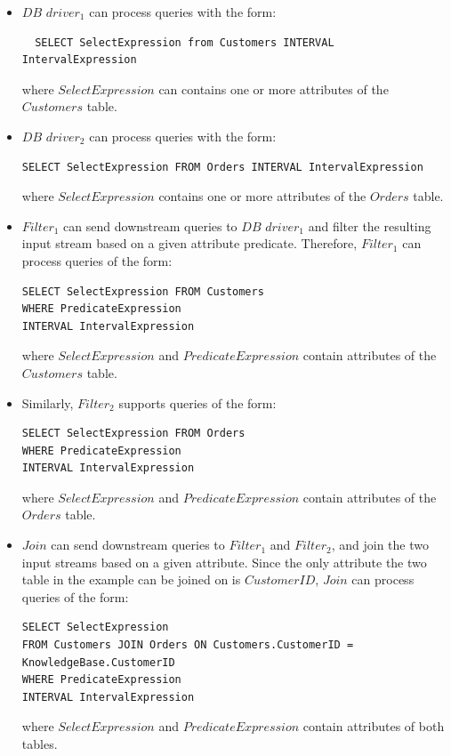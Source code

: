 \begin{itemize}
  \item $DB$ $driver_1$ can process queries with the form:
  \begin{lstlisting}
  SELECT SelectExpression from Customers INTERVAL IntervalExpression
  \end{lstlisting}
  where $SelectExpression$ can contains one or more attributes of the $Customers$ table.

\item $DB$ $driver_2$ can process queries with the form:
\begin{lstlisting}
SELECT SelectExpression FROM Orders INTERVAL IntervalExpression
\end{lstlisting}
where $SelectExpression$ contains one or more attributes of the $Orders$ table.

\item $Filter_1$ can send downstream queries to $DB$ $driver_1$ and filter the resulting input stream based on a given
attribute predicate.
Therefore, $Filter_1$ can process queries of the form:
\begin{lstlisting}
SELECT SelectExpression FROM Customers
WHERE PredicateExpression
INTERVAL IntervalExpression
\end{lstlisting}
where $SelectExpression$ and $PredicateExpression$ contain attributes of the $Customers$ table.

\item Similarly, $Filter_2$ supports queries of the form:
\begin{lstlisting}
SELECT SelectExpression FROM Orders
WHERE PredicateExpression
INTERVAL IntervalExpression
\end{lstlisting}
where $SelectExpression$ and $PredicateExpression$ contain attributes of the $Orders$ table.

\item $Join$ can send downstream queries to $Filter_1$ and $Filter_2$,
and join the two input streams based on a given attribute.
Since the only attribute the two table in the example can be joined on is $CustomerID$,
$Join$ can process queries of the form:
\begin{lstlisting}
SELECT SelectExpression
FROM Customers JOIN Orders ON Customers.CustomerID = KnowledgeBase.CustomerID
WHERE PredicateExpression
INTERVAL IntervalExpression
\end{lstlisting}
where $SelectExpression$ and $PredicateExpression$ contain attributes of both tables.

\end{itemize}

